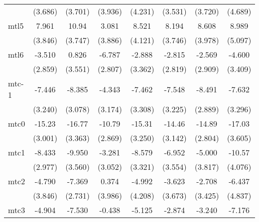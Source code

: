 \documentclass{article}
\begin{document}
{\begin{longtable}{l*{7}{c}}
                &  (3.686)         &  (3.701)         &  (3.936)         &  (4.231)         &  (3.531)         &  (3.720)         &  (4.689)         \\
mtl5            &    7.961\sym{*}  &    10.94\sym{**} &    3.081         &    8.521\sym{*}  &    8.194\sym{*}  &    8.608\sym{*}  &    8.989         \\
                &  (3.846)         &  (3.747)         &  (3.886)         &  (4.121)         &  (3.746)         &  (3.978)         &  (5.097)         \\
mtl6            &   -3.510         &    0.826         &   -6.787\sym{*}  &   -2.888         &   -2.815         &   -2.569         &   -4.600         \\
                &  (2.859)         &  (3.551)         &  (2.807)         &  (3.362)         &  (2.819)         &  (2.909)         &  (3.409)         \\
mtc-1           &   -7.446\sym{*}  &   -8.385\sym{*}  &   -4.343         &   -7.462\sym{*}  &   -7.548\sym{*}  &   -8.491\sym{**} &   -7.632\sym{*}  \\
                &  (3.240)         &  (3.078)         &  (3.174)         &  (3.308)         &  (3.225)         &  (2.889)         &  (3.296)         \\
mtc0            &   -15.23\sym{***}&   -16.77\sym{***}&   -10.79\sym{***}&   -15.31\sym{***}&   -14.46\sym{***}&   -14.89\sym{***}&   -17.03\sym{***}\\
                &  (3.001)         &  (3.363)         &  (2.869)         &  (3.250)         &  (3.142)         &  (2.804)         &  (3.605)         \\
mtc1            &   -8.433\sym{**} &   -9.950\sym{**} &   -3.281         &   -8.579\sym{*}  &   -6.952         &   -5.000         &   -10.57\sym{*}  \\
                &  (2.977)         &  (3.560)         &  (3.052)         &  (3.321)         &  (3.554)         &  (3.817)         &  (4.076)         \\
mtc2            &   -4.790         &   -7.369\sym{*}  &    0.374         &   -4.992         &   -3.623         &   -2.708         &   -6.437         \\
                &  (3.846)         &  (2.731)         &  (3.986)         &  (4.208)         &  (3.673)         &  (3.425)         &  (4.837)         \\
mtc3            &   -4.904         &   -7.530\sym{**} &   -0.438         &   -5.125         &   -2.874         &   -3.240         &   -7.176         \\

\end{longtable}}
\end{document}
